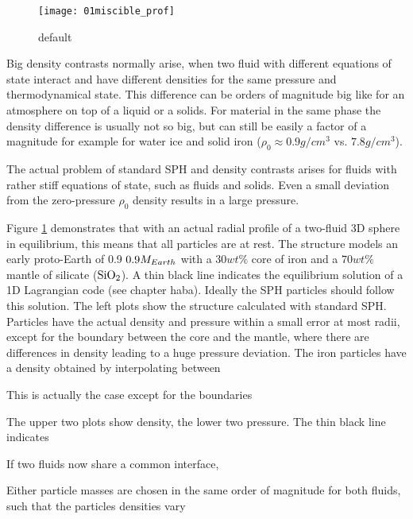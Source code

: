 \begin{figure}[htbp]
\begin{center}
\texttt{[image: 01miscible\_prof]}
\caption{default}
\label{ch02_fig01}
\end{center}
\end{figure}



Big density contrasts normally arise, when two fluid with different equations of state interact and have different densities for the same pressure and thermodynamical state. This difference can be orders of magnitude big like for an atmosphere on top of a liquid or a solids. For material in the same phase the density difference is usually not so big, but can still be easily a factor of a magnitude for example for water ice and solid iron ($\rho_0 \approx 0.9 g/cm^3$ vs. $7.8 g/cm^3$).

The actual problem of standard SPH and density contrasts arises for fluids with rather stiff equations of state, such as fluids and solids. Even a small deviation from the zero-pressure $\rho_0$ density results in a large pressure. 

Figure \ref{ch02_fig01} demonstrates that with an actual radial profile of a two-fluid 3D sphere in equilibrium, this means that all particles are at rest. The structure models an early proto-Earth of 0.9 $0.9 M_{Earth}$ with a $30 wt\%$ core of iron and a $70 wt\%$ mantle of silicate ($\mathrm{SiO}_2$). A thin black line indicates the equilibrium solution of a 1D Lagrangian code (see chapter haba). Ideally the SPH particles should follow this solution. The left plots show the structure calculated with standard SPH. Particles have the actual density and pressure within a small error at most radii, except for the boundary between the core and the mantle, where there are differences in density leading to a huge pressure deviation. The iron particles have a density obtained by interpolating between 

This is actually the case except for the boundaries 


The upper two plots show density, the lower two pressure. The thin black line indicates 


If two fluids now share a common interface,


Either particle masses are chosen in the same order of magnitude for both fluids, such that the particles densities vary 

